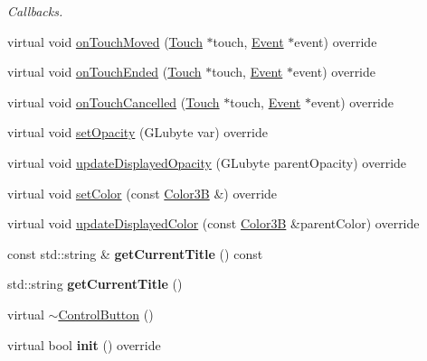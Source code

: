 \begin{DoxyCompactItemize}
\begin{DoxyCompactList}\small\item\em Callbacks. \end{DoxyCompactList}\item 
virtual void \hyperlink{classControlButton_a8c8a5c24adf67ec671fbc113889f0870}{on\+Touch\+Moved} (\hyperlink{classTouch}{Touch} $\ast$touch, \hyperlink{classEvent}{Event} $\ast$event) override
\item 
virtual void \hyperlink{classControlButton_a7597744c683964152429472a358b3fd2}{on\+Touch\+Ended} (\hyperlink{classTouch}{Touch} $\ast$touch, \hyperlink{classEvent}{Event} $\ast$event) override
\item 
virtual void \hyperlink{classControlButton_a32a7a37982d52d6660b532adabb8099e}{on\+Touch\+Cancelled} (\hyperlink{classTouch}{Touch} $\ast$touch, \hyperlink{classEvent}{Event} $\ast$event) override
\item 
virtual void \hyperlink{classControlButton_adfe6c80adc5ba24d50d21f5ff742f6a1}{set\+Opacity} (G\+Lubyte var) override
\item 
virtual void \hyperlink{classControlButton_a0d46b6a123c22e09c50e786b6dd5c68f}{update\+Displayed\+Opacity} (G\+Lubyte parent\+Opacity) override
\item 
virtual void \hyperlink{classControlButton_ade75d696a57fbe334ee40152aa2f4bc8}{set\+Color} (const \hyperlink{structColor3B}{Color3B} \&) override
\item 
virtual void \hyperlink{classControlButton_ab493879910cbb468f4f510a3e9393203}{update\+Displayed\+Color} (const \hyperlink{structColor3B}{Color3B} \&parent\+Color) override
\item 
\mbox{\label{classControlButton_abd2957b55acdb4eb6403c100e8fa6746}} 
const std\+::string \& {\bfseries get\+Current\+Title} () const
\item 
\mbox{\label{classControlButton_a142686419015efadb6ae6325f9370502}} 
std\+::string {\bfseries get\+Current\+Title} ()
\item 
virtual \hyperlink{classControlButton_a234095a162749b99b9fdc6dc6b62fdb7}{$\sim$\+Control\+Button} ()
\item 
\mbox{\label{classControlButton_a6d9a080e6c0b0f6be8717bfcc3fe1eaa}} 
virtual bool {\bfseries init} () override
\item 
\mbox{\label{classControlButton_a1286e90d92a8b487119b4b33b4dadcad}} 

\end{DoxyCompactItemize}

